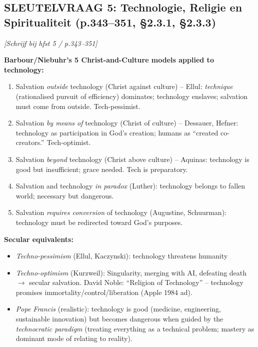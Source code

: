 \documentclass[a4paper,10pt]{article}
\begin{document}
\vspace{3pt}

\begin{answerbox}
\subsection{SLEUTELVRAAG 5: Technologie, Religie en Spiritualiteit (p.343--351, §2.3.1, §2.3.3)}

\textit{[Schrijf bij hfst 5 / p.343--351]}

\textbf{Barbour/Niebuhr's 5 Christ-and-Culture models applied to technology:}
\begin{enumerate}[noitemsep]
  \item Salvation \textit{outside} technology (Christ against culture) -- Ellul: \textit{technique} (rationalised pursuit of efficiency) dominates; technology enslaves; salvation must come from outside. Tech-pessimist.
  \item Salvation \textit{by means of} technology (Christ of culture) -- Dessauer, Hefner: technology as participation in God's creation; humans as ``created co-creators.'' Tech-optimist.
  \item Salvation \textit{beyond} technology (Christ above culture) -- Aquinas: technology is good but insufficient; grace needed. Tech is preparatory.
  \item Salvation and technology \textit{in paradox} (Luther): technology belongs to fallen world; necessary but dangerous.
  \item Salvation \textit{requires conversion} of technology (Augustine, Schuurman): technology must be redirected toward God's purposes.
\end{enumerate}

\textbf{Secular equivalents:}
\begin{itemize}[noitemsep]
  \item \textit{Techno-pessimism} (Ellul, Kaczynski): technology threatens humanity
  \item \textit{Techno-optimism} (Kurzweil): Singularity, merging with AI, defeating death $\to$ secular salvation. David Noble: ``Religion of Technology'' -- technology promises immortality/control/liberation (Apple 1984 ad).
  \item \textit{Pope Francis} (realistic): technology is good (medicine, engineering, sustainable innovation) but becomes dangerous when guided by the \textit{technocratic paradigm} (treating everything as a technical problem; mastery as dominant mode of relating to reality).
\end{itemize}


\end{answerbox}
\end{document}
